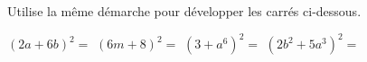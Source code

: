 %
%
Utilise la même démarche pour développer les carrés ci-dessous.
  \begin{tasks}
    \task $\left(2a+6b\right)^2=$
    \task $\left(6m+8\right)^2=$
    \task $\left(3+a^6\right)^2=$
    \task $\left(2b^2 + 5a^3\right)^2=$
  \end{tasks}
